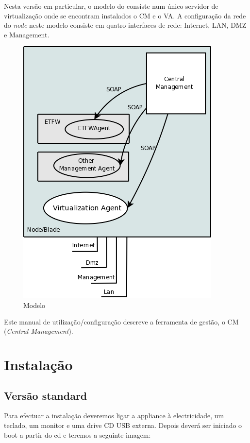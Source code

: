 Nesta versão em particular, o modelo do \acronym consiste num único servidor de virtualização onde se encontram instalados o CM e o VA. A configuração da rede do \emph{node} neste modelo consiste em quatro interfaces de rede: Internet, LAN, DMZ e Management.
\begin{figure}[H]
    \begin{center}
	\includegraphics[scale=0.4]{screenshots/etva_standard.png}
	\caption{Modelo \acronym}
	\label{fig:etva_standard}
	\end{center}
\end{figure}
 
Este manual de utilização/configuração descreve a ferramenta de gestão, o CM (\emph{Central Management}).

\pagebreak
\chapter{\textsf{Instalação}}
\label{chp:installation}
\section{Versão standard}

Para efectuar a instalação deveremos ligar a appliance à electricidade, um teclado, um monitor e uma drive CD USB externa.
Depois deverá ser iniciado o boot a partir do cd e teremos a seguinte imagem:

